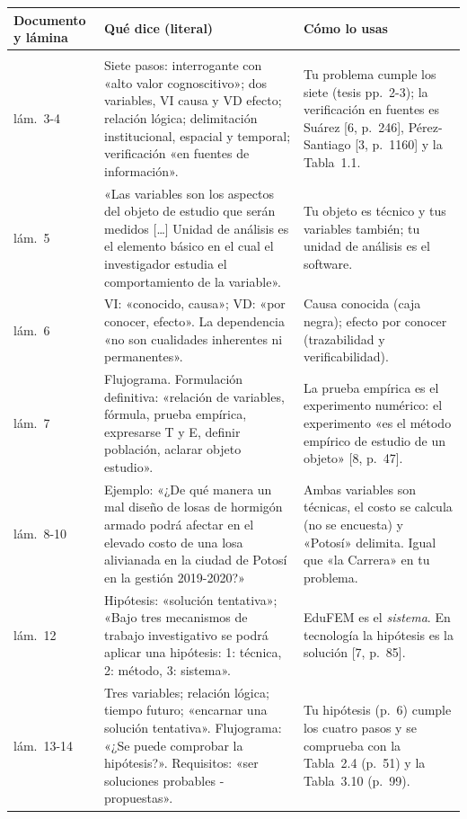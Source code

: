 \documentclass[11pt,a4paper]{article}
\begin{document}
{\small
\begin{longtable}{@{}L{3.0cm}L{7.1cm}L{5.6cm}@{}}
\toprule
\textbf{Documento y lámina} & \textbf{Qué dice (literal)} & \textbf{Cómo lo usas}\\
\midrule\endhead
\bottomrule\endfoot
{}\\
lám.~3-4 & Siete pasos: interrogante con «alto valor cognoscitivo»; dos variables, VI causa y VD efecto; relación lógica; delimitación institucional, espacial y temporal; verificación «en fuentes de información». & Tu problema cumple los siete (tesis pp.~2-3); la verificación en fuentes es Suárez [6, p.~246], Pérez-Santiago [3, p.~1160] y la Tabla~1.1.\\
lám.~5 & «Las variables son los aspectos del objeto de estudio que serán medidos [\ldots] Unidad de análisis es el elemento básico en el cual el investigador estudia el comportamiento de la variable». & Tu objeto es técnico y tus variables también; tu unidad de análisis es el software.\\
lám.~6 & VI: «conocido, causa»; VD: «por conocer, efecto». La dependencia «no son cualidades inherentes ni permanentes». & Causa conocida (caja negra); efecto por conocer (trazabilidad y verificabilidad).\\
lám.~7 & Flujograma. Formulación definitiva: «relación de variables, fórmula, prueba empírica, expresarse T y E, definir población, aclarar objeto estudio». & La prueba empírica es el experimento numérico: el experimento «es el método empírico de estudio de un objeto» [8, p.~47].\\
lám.~8-10 & Ejemplo: «¿De qué manera un mal diseño de losas de hormigón armado podrá afectar en el elevado costo de una losa alivianada en la ciudad de Potosí en la gestión 2019-2020?» & Ambas variables son técnicas, el costo se calcula (no se encuesta) y «Potosí» delimita. Igual que «la Carrera» en tu problema.\\
lám.~12 & Hipótesis: «solución tentativa»; «Bajo tres mecanismos de trabajo investigativo se podrá aplicar una hipótesis: 1: técnica, 2: método, 3: sistema». & EduFEM es el \emph{sistema}. En tecnología la hipótesis es la solución [7, p.~85].\\
lám.~13-14 & Tres variables; relación lógica; tiempo futuro; «encarnar una solución tentativa». Flujograma: «¿Se puede comprobar la hipótesis?». Requisitos: «ser soluciones probables - propuestas». & Tu hipótesis (p.~6) cumple los cuatro pasos y se comprueba con la Tabla~2.4 (p.~51) y la Tabla~3.10 (p.~99).\\

\end{longtable}}
\end{document}
